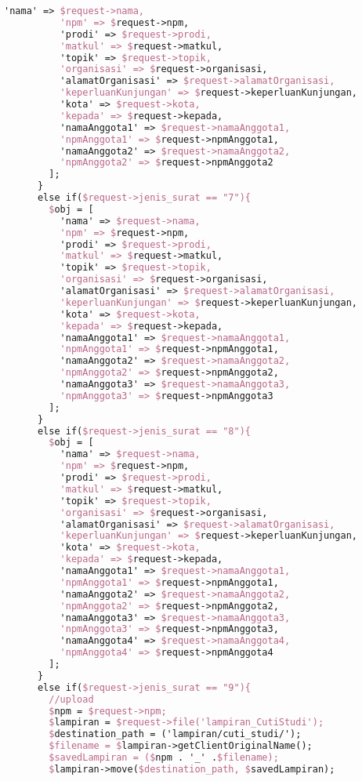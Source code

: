 \begin{lstlisting}[language=tex,basicstyle=\tiny,caption=PesanansuratController.php]
          'nama' => $request->nama,
          'npm' => $request->npm,
          'prodi' => $request->prodi,
          'matkul' => $request->matkul,
          'topik' => $request->topik,
          'organisasi' => $request->organisasi,
          'alamatOrganisasi' => $request->alamatOrganisasi,
          'keperluanKunjungan' => $request->keperluanKunjungan,
          'kota' => $request->kota,
          'kepada' => $request->kepada,
          'namaAnggota1' => $request->namaAnggota1,
          'npmAnggota1' => $request->npmAnggota1,
          'namaAnggota2' => $request->namaAnggota2,
          'npmAnggota2' => $request->npmAnggota2
        ];
      }
      else if($request->jenis_surat == "7"){
        $obj = [
          'nama' => $request->nama,
          'npm' => $request->npm,
          'prodi' => $request->prodi,
          'matkul' => $request->matkul,
          'topik' => $request->topik,
          'organisasi' => $request->organisasi,
          'alamatOrganisasi' => $request->alamatOrganisasi,
          'keperluanKunjungan' => $request->keperluanKunjungan,
          'kota' => $request->kota,
          'kepada' => $request->kepada,
          'namaAnggota1' => $request->namaAnggota1,
          'npmAnggota1' => $request->npmAnggota1,
          'namaAnggota2' => $request->namaAnggota2,
          'npmAnggota2' => $request->npmAnggota2,
          'namaAnggota3' => $request->namaAnggota3,
          'npmAnggota3' => $request->npmAnggota3
        ];
      }
      else if($request->jenis_surat == "8"){
        $obj = [
          'nama' => $request->nama,
          'npm' => $request->npm,
          'prodi' => $request->prodi,
          'matkul' => $request->matkul,
          'topik' => $request->topik,
          'organisasi' => $request->organisasi,
          'alamatOrganisasi' => $request->alamatOrganisasi,
          'keperluanKunjungan' => $request->keperluanKunjungan,
          'kota' => $request->kota,
          'kepada' => $request->kepada,
          'namaAnggota1' => $request->namaAnggota1,
          'npmAnggota1' => $request->npmAnggota1,
          'namaAnggota2' => $request->namaAnggota2,
          'npmAnggota2' => $request->npmAnggota2,
          'namaAnggota3' => $request->namaAnggota3,
          'npmAnggota3' => $request->npmAnggota3,
          'namaAnggota4' => $request->namaAnggota4,
          'npmAnggota4' => $request->npmAnggota4
        ];
      }
      else if($request->jenis_surat == "9"){
        //upload
        $npm = $request->npm;
        $lampiran = $request->file('lampiran_CutiStudi');
        $destination_path = ('lampiran/cuti_studi/');
        $filename = $lampiran->getClientOriginalName();
        $savedLampiran = ($npm . '_' .$filename);
        $lampiran->move($destination_path, $savedLampiran);


\end{lstlisting}
